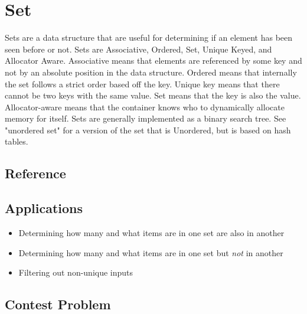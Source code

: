\section{Set}
Sets are a data structure that are useful for determining if an element has been seen before or not.  Sets are Associative, Ordered, Set, Unique Keyed, and Allocator Aware\cite{cplusplus}.  Associative means that elements are referenced by some key and not by an absolute position in the data structure. Ordered means that internally the set follows a strict order based off the key.  Unique key means that there cannot be two keys with the same value.  Set means that the key is also the value. Allocator-aware means that the container knows who to dynamically allocate memory for itself.  Sets are generally implemented as a binary search tree.  See "unordered set" for a version of the set that is Unordered, but is based on hash tables.

\subsection{Reference}


\subsection{Applications}
\begin{itemize}
    \item   Determining how many and what items are in one set are also in another
    \item   Determining how many and what items are in one set but \emph{not} in another
    \item   Filtering out non-unique inputs
\end{itemize}

\subsection{Contest Problem}

